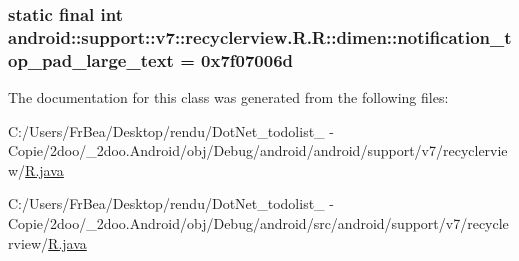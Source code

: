 \hypertarget{classandroid_1_1support_1_1v7_1_1recyclerview_1_1_r_1_1dimen_c89ac9deccb807e67ab3f941ecdbef90}{
\subsubsection[{notification\_\-top\_\-pad\_\-large\_\-text}]{\setlength{\rightskip}{0pt plus 5cm}static final int android::support::v7::recyclerview.R.R::dimen::notification\_\-top\_\-pad\_\-large\_\-text = 0x7f07006d}}
\label{classandroid_1_1support_1_1v7_1_1recyclerview_1_1_r_1_1dimen_c89ac9deccb807e67ab3f941ecdbef90}




The documentation for this class was generated from the following files:\begin{CompactItemize}
\item 
C:/Users/FrBea/Desktop/rendu/DotNet\_\-todolist\_ - Copie/2doo/\_\-2doo.Android/obj/Debug/android/android/support/v7/recyclerview/\hyperlink{android_2support_2v7_2recyclerview_2_r_8java}{R.java}\item 
C:/Users/FrBea/Desktop/rendu/DotNet\_\-todolist\_ - Copie/2doo/\_\-2doo.Android/obj/Debug/android/src/android/support/v7/recyclerview/\hyperlink{src_2android_2support_2v7_2recyclerview_2_r_8java}{R.java}\end{CompactItemize}
